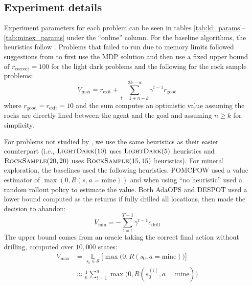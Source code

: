 \fi





\subsection*{Experiment details}

Experiment parameters for each problem can be seen in tables \ref{tab:ld_params}--\ref{tab:minex_params} under the ``online'' column.
For the baseline algorithms, the heuristics follow \citeauthor{wu2021adaptive}.
Problems that failed to run due to memory limits followed suggestions from \citeauthor{adaops2021review} to first use the MDP solution and then use a fixed upper bound of $r_\text{correct}=100$ for the light dark problems and the following for the rock sample problems:
\begin{equation}
    V_\text{max} =  r_\text{exit} + \sum_{t=1+n-k}^{2k-n} \gamma^{t-1}r_\text{good}
\end{equation}
where $r_\text{good} = r_\text{exit} = 10$ and the sum computes an optimistic value assuming the rocks are directly lined between the agent and the goal and assuming $n \ge k$ for simplicity.

For problems not studied by \citeauthor{wu2021adaptive}, we use the same heuristics as their easier counterpart (i.e., $\textsc{LightDark}(10)$ uses $\textsc{LightDark}(5)$ heuristics and $\textsc{RockSample}(20,20)$ uses $\textsc{RockSample}(15,15)$ heuristics).
For mineral exploration, the baselines used the following heuristics.
POMCPOW used a value estimator of $\max(0, R(s, a=\text{mine}))$ and when using ``no heuristic'' used a random rollout policy to estimate the value.
Both AdaOPS and DESPOT used a lower bound computed as the returns if fully drilled all locations, then made the decision to abandon:
\begin{equation}
    V_\text{min} = -\sum_{t=1}^{T-1} \gamma^{t-1}c_\text{drill}
\end{equation}
The upper bound comes from an oracle taking the correct final action without drilling, computed over $10{,}000$ states:
\begin{align}
    V_\text{max} &= \operatorname*{\mathbb{E}}_{s_0 \in \mathcal{S}} \bigg[ \max\Big(0, R(s_0, a=\text{mine})\Big) \bigg] \\
                 &\approx \frac{1}{n}\sum_{i=1}^n \max\Big(0, R(s_0^{(i)}, a=\text{mine})\Big) \nonumber
\end{align}

